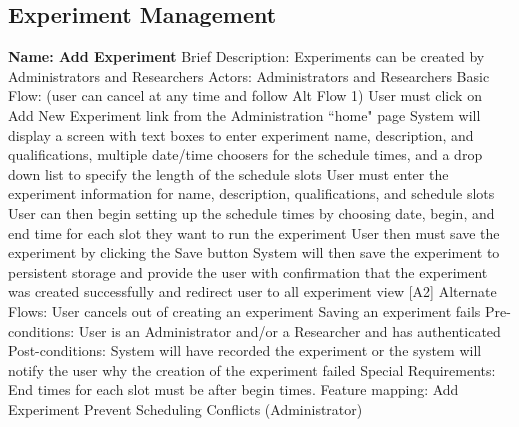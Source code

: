 \subsection{Experiment Management}
\begin{outline}[enumerate]

\1 {\bf Name: Add Experiment}
\2 Brief Description: Experiments can be created by Administrators and Researchers
\2 Actors: Administrators and Researchers
\2 Basic Flow: (user can cancel at any time and follow Alt Flow 1)
\3 User must click on Add New Experiment link from the Administration ``home" page
\3 System will display a screen with text boxes to enter experiment name, description,  and qualifications, multiple date/time choosers for the schedule times, and a drop down list to specify the length of the schedule slots
\3 User must enter the experiment information for name, description, qualifications, and schedule slots
\3 User can then begin setting up the schedule times by choosing date, begin, and end time for each slot they want to run the experiment
\3 User then must save the experiment by clicking the Save button
\3 System will then save the experiment to persistent storage and provide the user with confirmation that the experiment was created successfully and redirect user to all experiment view [A2]
\2 Alternate Flows:
\3 [A1] User cancels out of creating an experiment
\3 [A2] Saving an experiment fails
\2 Pre-conditions:
\3 User is an Administrator and/or a Researcher and has authenticated
\2 Post-conditions:
\3 System will have recorded the experiment or the system will notify the user why the creation of the experiment failed
\2 Special Requirements:
\3 End times for each slot must be after begin times.
\2 Feature mapping:
\3 Add Experiment
\3 Prevent Scheduling Conflicts (Administrator)


\end{outline}

